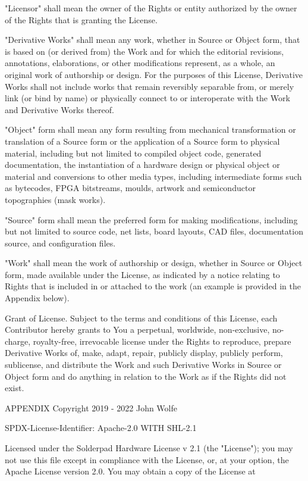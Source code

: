 \documentclass[11pt]{book} %
\begin{document}
        \textbullet"Licensor" shall mean the owner of the Rights or entity authorized by the owner of the Rights that is granting the License.

        \textbullet"Derivative Works" shall mean any work, whether in Source or Object form, that is based on (or derived from) the Work and for which the editorial revisions, annotations, elaborations, or other modifications represent, as a whole, an original work of authorship or design. For the purposes of this License, Derivative Works shall not include works that remain reversibly separable from, or merely link (or bind by name) or physically connect to or interoperate with the Work and Derivative Works thereof.

        \textbullet"Object" form shall mean any form resulting from mechanical transformation or translation of a Source form or the application of a Source form to physical material, including but not limited to compiled object code, generated documentation, the instantiation of a hardware design or physical object or material and conversions to other media types, including intermediate forms such as bytecodes, FPGA bitstreams, moulds, artwork and semiconductor topographies (mask works).

        \textbullet"Source" form shall mean the preferred form for making modifications, including but not limited to source code, net lists, board layouts, CAD files, documentation source, and configuration files.

        \textbullet"Work" shall mean the work of authorship or design, whether in Source or Object form, made available under the License, as indicated by a notice relating to Rights that is included in or attached to the work (an example is provided in the Appendix below).

Grant of License. Subject to the terms and conditions of this License, each Contributor hereby grants to You a perpetual, worldwide, non-exclusive, no-charge, royalty-free, irrevocable license under the Rights to reproduce, prepare Derivative Works of, make, adapt, repair, publicly display, publicly perform, sublicense, and distribute the Work and such Derivative Works in Source or Object form and do anything in relation to the Work as if the Rights did not exist.

APPENDIX
Copyright 2019 - 2022 John Wolfe

SPDX-License-Identifier: Apache-2.0 WITH SHL-2.1

Licensed under the Solderpad Hardware License v 2.1 (the "License"); you may not use this file except in compliance with the License, or, at your option, the Apache License version 2.0. You may obtain a copy of the License at
\end{document}
